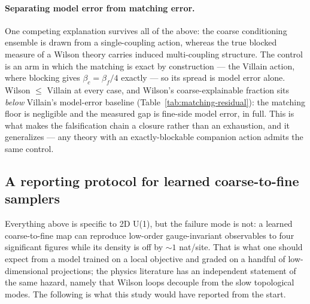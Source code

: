 \paragraph{Separating model error from matching error.} One competing
explanation survives all of the above: the coarse conditioning ensemble is
drawn from a single-coupling action, whereas the true blocked measure of a
Wilson theory carries induced multi-coupling structure. The control is an arm
in which the matching is exact by construction --- the Villain action, where
blocking gives $\beta_c = \beta_f/4$ exactly --- so its spread is model error
alone. Wilson $\le$ Villain at every case, and Wilson's coarse-explainable
fraction sits \emph{below} Villain's model-error baseline
(Table~\ref{tab:matching-residual}): the matching floor is negligible and the
measured gap is fine-side model error, in full. This is what makes the
falsification chain a closure rather than an exhaustion, and it generalizes
--- any theory with an exactly-blockable companion action admits the same
control.

\subsection{A reporting protocol for learned coarse-to-fine samplers}
\label{sec:appendix-v2-protocol}

Everything above is specific to 2D U(1), but the failure mode is not: a
learned coarse-to-fine map can reproduce low-order gauge-invariant
observables to four significant figures while its density is off by ${\sim}1$
nat/site. That is what one should expect from a model trained on a local
objective and graded on a handful of low-dimensional projections; the physics
literature has an independent statement of the same hazard, namely that
Wilson loops decouple from the slow topological modes. The following is what
this study would have reported from the start.

